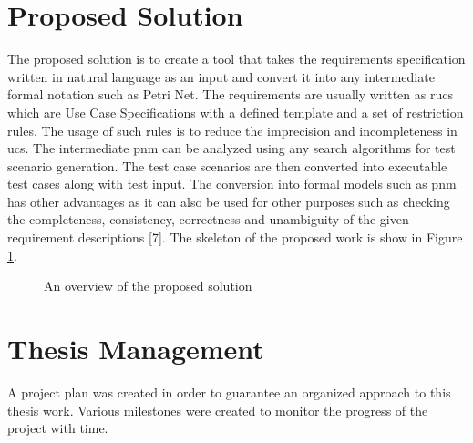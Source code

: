 \section{Proposed Solution}
The proposed solution is to create a tool that takes the requirements specification written in natural language as an input and convert it into any intermediate formal notation such as Petri Net. The requirements are usually written as \gls{rucs} which are Use Case Specifications with a defined template and a set of restriction rules. The usage of such rules is to reduce the imprecision and incompleteness in \gls{ucs}. The intermediate \gls{pnm} can be analyzed using any search algorithms for test scenario generation. The test case scenarios are then converted into executable test cases along with test input. The conversion into formal models such as \gls{pnm} has other advantages as it can also be used for other purposes such as checking the completeness, consistency, correctness and unambiguity of the given requirement descriptions [7]. The skeleton of the proposed work is show in Figure \ref{fig:proposed_solution}.
\begin{figure}[htb!]
\centering
{}
\caption{An overview of the proposed solution}
\label{fig:proposed_solution}
\end{figure}

\section{Thesis Management}
A project plan was created in order to guarantee an organized approach to this thesis work. Various milestones were created to monitor the progress of the project with time.
